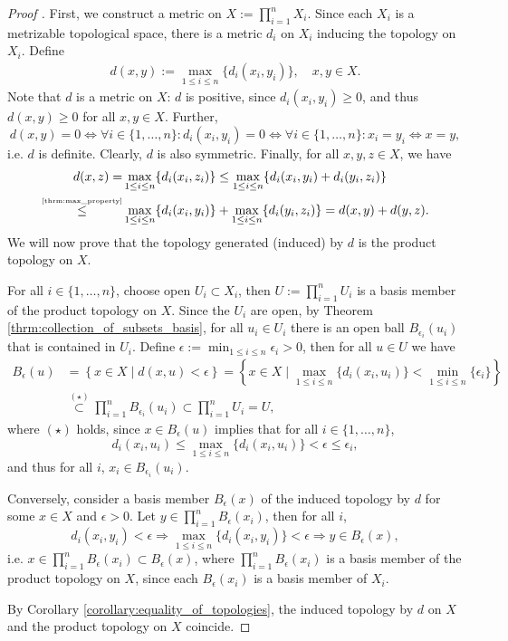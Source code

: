 \begin{proof}[Proof \cite{src:product_topology}]
	First, we construct a metric on $X := \prod_{i=1}^{n}X_i$. Since each $X_i$ is a metrizable topological space, there is a metric $d_i$ on $X_i$ inducing the topology on $X_i$. Define
	\begin{align}
		d(x, y) := \max_{1\leq i\leq n}\{d_i(x_i, y_i)\}, \quad x, y\in X.
	\end{align}
	Note that $d$ is a metric on $X$: $d$ is positive, since $d_{i}(x_i, y_i) \geq 0$, and thus $d(x, y)\geq 0$ for all $x, y\in X$. Further,
	$$d(x, y) = 0 \Leftrightarrow \forall i\in \{1, \dots, n\}: d_i(x_i, y_i) = 0 \Leftrightarrow \forall i\in \{1, \dots, n\}: x_i = y_i\Leftrightarrow x = y,$$
	i.e. $d$ is definite. Clearly, $d$ is also symmetric. Finally, for all $x, y, z\in X$, we have
	\begin{align*}
		d(x, z) = &\max_{1\leq i\leq n}\{d_i(x_i, z_i)\} \leq \max_{1\leq i\leq n}\{d_i(x_i, 
		y_i) + d_i(y_i, z_i)\} 
		\\ \overset{\tiny\eqref{thrm:max_property}}{\leq} &\max_{1\leq i\leq n}\{d_i(x_i, y_i)\} + \max_{1\leq i\leq n}\{d_i(y_i, z_i)\} = d(x, y) + d(y, z).
	\end{align*}		
	We will now prove that the topology generated (induced) by $d$ is the product topology on $X$. 
	
	For all $i\in\{1, \dots, n\}$, choose open $U_i\subset X_i$, then $U := \prod_{i=1}^{n}U_i$ is a basis member of the product topology on $X$. Since the $U_i$ are open, by Theorem \ref{thrm:collection_of_subsets_basis}, for all $u_i\in U_i$ there is an open ball $B_{\epsilon_i}(u_i)$ that is contained in $U_i$. Define $\epsilon := \min_{1\leq i\leq n}\epsilon_i > 0$, then for all $u\in U$ we have 
	\begin{align*}
		B_{\epsilon}(u) &= \left\{x\in X \mid d(x, u) < \epsilon \right\} = \left\{x\in X\mid \max_{1\leq i\leq n}\{ d_i(x_i, u_i) \} < \min_{1\leq i\leq n}\{\epsilon_i\} \right\} \\ &\overset{(\star)}{\subset} \prod_{i=1}^{n}B_{\epsilon_i}(u_i) \subset \prod_{i=1}^{n}U_i = U,
	\end{align*}
	where $(\star)$ holds, since $x\in B_{\epsilon}(u)$ implies that for all $i\in\{1, \dots, n\}$,
	$$d_i(x_i, u_i) \leq \max_{1\leq i\leq n}\{ d_i(x_i, u_i) \} < \epsilon \leq \epsilon_i,$$
	and thus for all $i$, $x_i\in B_{\epsilon_i}(u_i)$.
	
	Conversely, consider a basis member $B_{\epsilon}(x)$ of the induced topology by $d$ for some $x\in X$ and $\epsilon > 0$. Let $y\in \prod_{i=1}^{n}B_{\epsilon}(x_i)$, then for all $i$, 
	$$d_i(x_i, y_i) < \epsilon \Rightarrow \max_{1\leq i\leq n}\{d_i(x_i, y_i)\} < \epsilon \Rightarrow y\in B_{\epsilon}(x),$$
	i.e. $x\in \prod_{i=1}^{n}B_{\epsilon}(x_i)\subset B_{\epsilon}(x)$, where $\prod_{i=1}^{n}B_{\epsilon}(x_i)$ is a basis member of the product topology on $X$, since each $B_{\epsilon}(x_i)$ is a basis member of $X_i$. 
	
	By Corollary \ref{corollary:equality_of_topologies}, the induced topology by $d$ on $X$ and the product topology on $X$ coincide.
\end{proof}

